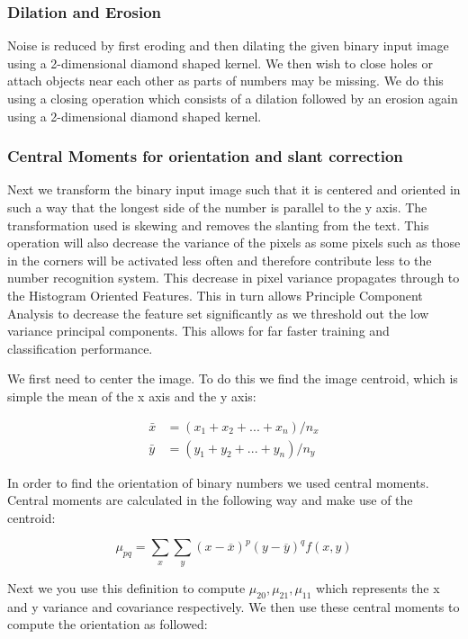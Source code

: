 \documentclass[%
        compressed,
        final,
        notitlepage,
        narroweqnarray,
        inline,
        twoside,
        ]{ieee}
\begin{document}
\subsubsection{Dilation and Erosion}

Noise is reduced by first eroding and then dilating the given binary input image
using a 2-dimensional diamond shaped kernel. We then wish to close holes or
attach objects near each other
as parts of numbers may be missing. We do this using a closing operation which
consists of a dilation followed by an erosion again using a 2-dimensional diamond shaped kernel.

\subsubsection{Central Moments for orientation and slant correction}
Next we transform the binary input image such that it is centered and oriented in such a way that the longest side of the number is parallel to the y axis. The transformation used is skewing and removes the slanting from the text. This operation will also decrease the variance of the pixels as some pixels such as those in the corners will be activated less often and therefore contribute less to the number recognition system. This decrease in pixel variance propagates through to the Histogram Oriented Features. This in turn allows Principle Component Analysis to decrease the feature set significantly as we threshold out the low variance principal components. This allows for far faster training and classification performance.

We first need to center the image. To do this we find the image centroid, which is simple the mean of the x axis and the y axis:

\begin{align}
    \bar{x}&=(x_1+x_2+...+x_n)/n_x \\
    \bar{y}&=(y_1+y_2+...+y_n)/n_y
\end{align}

In order to find the orientation of binary numbers we used central moments. Central moments are calculated in the following way and make use of the centroid:

\begin{equation}
    \mu_{pq} = \sum_x \sum_y (x - \overline{x})^p(y - \overline{y})^q f(x, y)
\end{equation}

 
Next we you use this definition to compute $\mu_{20}, \mu_{21}, \mu_{11}$ which represents the x and y variance and covariance respectively. We then use these central moments to compute the orientation as followed:
\end{document}
